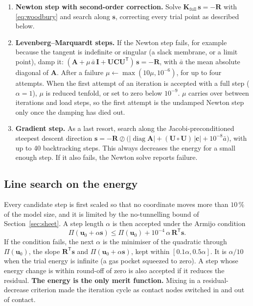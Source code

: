 \documentclass[11pt,a4paper]{article}
\newcommand{\vect}[1]{\bm{#1}}
\newcommand{\uu}{\vect{u}}
\newcommand{\R}{\vect{R}}
\newcommand{\K}{\mathbf{K}}
\newcommand{\I}{\mathbf{I}}
\DeclareMathOperator{\diag}{diag}
\theoremstyle{remark}
\begin{document}
\begin{enumerate}[leftmargin=*]
\item \textbf{Newton step with second-order correction.} Solve $\K_{\text{full}}\,\vect{s} = -\R$
with \eqref{eq:woodbury} and search along $\vect{s}$, correcting every trial point as described
below.
\item \textbf{Levenberg--Marquardt steps.} If the Newton step fails, for example because the
tangent is indefinite or singular (a slack membrane, or a limit point), damp it:
$(\mathbf{A} + \mu\,\bar{a}\,\I + \mathbf{U}\mathbf{C}\mathbf{U}^{\mathsf T})\,\vect{s} = -\R$, with
$\bar a$ the mean absolute diagonal of $\mathbf{A}$. After a failure $\mu \leftarrow
\max(10\mu, 10^{-6})$, for up to four attempts. When the first attempt of an iteration is
accepted with a full step ($\alpha=1$), $\mu$ is reduced tenfold, or set to zero below $10^{-9}$.
$\mu$ carries over between iterations and load steps, so the first attempt is the undamped Newton
step only once the damping has died out.
\item \textbf{Gradient step.} As a last resort, search along the Jacobi-preconditioned steepest
descent direction $\vect{s} = -\R \oslash \big(|\diag\mathbf{A}| + (\mathbf{U}\circ\mathbf{U})\,|\vect{c}| + 10^{-8}\bar a\big)$,
with up to 40 backtracking steps. This always decreases the energy for a small enough step. If
it also fails, the Newton solve reports failure.
\end{enumerate}

\subsection{Line search on the energy}

Every candidate step is first scaled so that no coordinate moves more than $10\,\%$ of the model
size, and it is limited by the no-tunnelling bound of Section~\ref{sec:sheet}. A step length
$\alpha$ is then accepted under the Armijo condition \cite{nocedal2006}
\begin{equation}
\Pi(\uu_0 + \alpha\vect{s}) \le \Pi(\uu_0) + 10^{-4}\,\alpha\,\R^{\mathsf T}\vect{s}.
\end{equation}
If the condition fails, the next $\alpha$ is the minimiser of the quadratic through $\Pi(\uu_0)$,
the slope $\R^{\mathsf T}\vect{s}$ and $\Pi(\uu_0+\alpha\vect{s})$, kept within
$[0.1\alpha, 0.5\alpha]$. It is $\alpha/10$ when the trial energy is infinite (a gas pocket
squeezed to zero). A step whose energy change is within round-off of zero is also accepted if it
reduces the residual. \textbf{The energy is the only merit function.} Mixing in a
residual-decrease criterion made the iteration cycle as contact nodes switched in and out of
contact.
\end{document}
